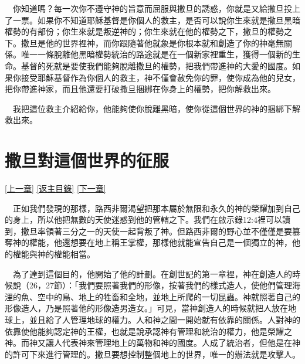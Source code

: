 \documentclass{book}
\begin{document}
　你知道嗎？每一次你不遵守神的旨意而屈服與撒旦的誘惑，你就是又給撒旦投上了一票。如果你不知道耶穌基督是你個人的救主，是否可以說你生來就是撒旦黑暗權勢的有部份；你生來就是叛逆神的；你生來就在他的權勢之下，撒旦的權勢之下。撒旦是他的世界裡神，而你跟隨著他就象是你根本就和創造了你的神毫無關係。唯一一條脫離他黑暗權勢統治的路途就是在一個新家裡重生，獲得一個新的生命。基督的死就是要使我們能夠脫離撒旦的權勢，把我們帶進神的大愛的國度。如果你接受耶穌基督作為你個人的救主，神不僅會赦免你的罪，使你成為他的兒女，把你帶進神家，而且他還要打破撒旦捆綁在你身上的權勢，把你解救出來。

　我把這位救主介紹給你，他能夠使你脫離黑暗，使你從這個世界的神的捆綁下解救出來。

\chapter{撒旦對這個世界的征服}
\label{sec:ch04}
\hyperref[sec:ch03]{[上一章]}
\hyperlink{toc}{[返主目錄]}
\hyperref[sec:ch05]{[下一章]}

\begin{center}
\noindent{}
\end{center}

　正如我們發現的那樣，路西非爾渴望把那本屬於無限和永久的神的榮耀加到自己的身上，所以他把無數的天使迷惑到他的管轄之下。我們在啟示錄12:4裡可以讀到，撒旦率領著三分之一的天使一起背叛了神。但路西非爾的野心並不僅僅是要篡奪神的權能，他還想要在地上稱王掌權，那樣他就能宣告自己是一個獨立的神，他的權能與神的權能相當。

　為了達到這個目的，他開始了他的計劃。在創世記的第一章裡，神在創造人的時候說（26，27節）：「我們要照著我們的形像，按著我們的樣式造人，使他們管理海浬的魚、空中的鳥、地上的牲畜和全地，並地上所爬的一切昆蟲。神就照著自己的形像造人，乃是照著他的形像造男造女。」可見，當神創造人的時候就把人放在地球上，並且給了人管理地球的權力。人和神之間一開始就有依靠的關係。人對神的依靠使他能夠認定神的王權，也就是說承認神有管理和統治的權力，他是榮耀之神。而神又讓人代表神來管理地上的萬物和神的國度。人成了統治者，但他是在神的許可下來進行管理的。撒旦要想控制整個地上的世界，唯一的辦法就是攻擊人。
\end{document}
